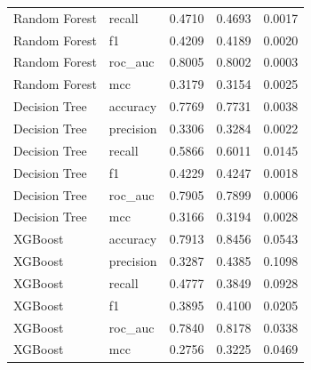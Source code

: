 \begin{tabular}{llrrr}
Random Forest & recall & 0.4710 & 0.4693 & 0.0017 \\
Random Forest & f1 & 0.4209 & 0.4189 & 0.0020 \\
Random Forest & roc\_auc & 0.8005 & 0.8002 & 0.0003 \\
Random Forest & mcc & 0.3179 & 0.3154 & 0.0025 \\
Decision Tree & accuracy & 0.7769 & 0.7731 & 0.0038 \\
Decision Tree & precision & 0.3306 & 0.3284 & 0.0022 \\
Decision Tree & recall & 0.5866 & 0.6011 & 0.0145 \\
Decision Tree & f1 & 0.4229 & 0.4247 & 0.0018 \\
Decision Tree & roc\_auc & 0.7905 & 0.7899 & 0.0006 \\
Decision Tree & mcc & 0.3166 & 0.3194 & 0.0028 \\
XGBoost & accuracy & 0.7913 & 0.8456 & 0.0543 \\
XGBoost & precision & 0.3287 & 0.4385 & 0.1098 \\
XGBoost & recall & 0.4777 & 0.3849 & 0.0928 \\
XGBoost & f1 & 0.3895 & 0.4100 & 0.0205 \\
XGBoost & roc\_auc & 0.7840 & 0.8178 & 0.0338 \\
XGBoost & mcc & 0.2756 & 0.3225 & 0.0469 \\
\bottomrule
\end{tabular}
